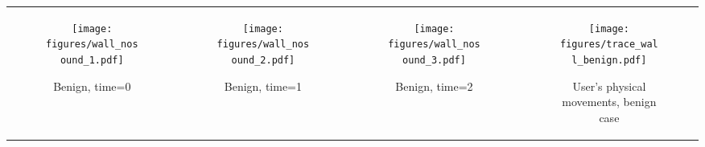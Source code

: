 \begin{figure*}
    \centering
    \begin{tabular}{cccc}
        \begin{subfigure}[b]{0.22\textwidth}
            \centering
            \texttt{[image: figures/wall\_nosound\_1.pdf]}
            \caption{Benign, time=0}
            \label{subfig:wall_nosound_frame1}
        \end{subfigure} &
        \begin{subfigure}[b]{0.22\textwidth}
            \centering
            \texttt{[image: figures/wall\_nosound\_2.pdf]}
            \caption{Benign, time=1}
            \label{subfig:wall_nosound_frame2}
        \end{subfigure} &
        \begin{subfigure}[b]{0.22\textwidth}
            \centering
            \texttt{[image: figures/wall\_nosound\_3.pdf]}
            \caption{Benign, time=2}
            \label{subfig:wall_nosound_frame3}
        \end{subfigure} &
        \begin{subfigure}[b]{0.24\textwidth}
            \centering
            \texttt{[image: figures/trace\_wall\_benign.pdf]}
            \caption{User's physical movements, benign case}
            \label{subfig:trace_wall_benign}
        \end{subfigure} \\
        

\end{tabular}
\end{figure*}
